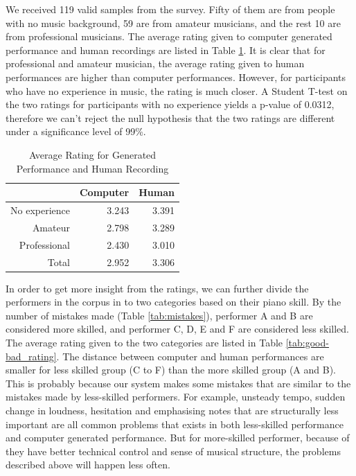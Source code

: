 

We received 119 valid samples from the survey. Fifty of them are from people with no music background, 59 are from amateur musicians, and the rest 10 are from professional musicians. The average rating given to computer generated performance and human recordings are listed in Table \ref{tab:avg_rating}. It is clear that for professional and amateur musician, the average rating given to human performances are higher than computer performances. However, for participants who have no experience in music, the rating is much closer. A Student T-test on the two ratings for participants with no experience yields a p-value of 0.0312, therefore we can't reject the null hypothesis that the two ratings are different under a significance level of 99\%.

\begin{table}
   \centering
   \caption{Average Rating for Generated Performance and Human Recording}
   \label{tab:avg_rating}
   \begin{tabular}{r|rr}
      \hline
      &Computer &Human \\
      \hline
      No experience&3.243&3.391\\
      Amateur&2.798&3.289\\
      Professional&2.430&3.010\\
      \hline
      Total&2.952&3.306\\
      \hline
   \end{tabular}
\end{table}

In order to get more insight from the ratings, we can further divide the performers in the corpus in to two categories based on their piano skill. By the number of mistakes made (Table \ref{tab:mistakes}), performer A and B are considered more skilled, and performer C, D, E and F are considered less skilled. The average rating given to the two categories are listed in Table \ref{tab:good-bad_rating}. The distance between computer and human performances are smaller for less skilled group (C to F) than the more skilled group (A and B). This is probably because our system makes some mistakes that are similar to the mistakes made by less-skilled performers. For example, unsteady tempo, sudden change in loudness, hesitation and emphasising notes that are structurally less important are all common problems that exists in both less-skilled performance and computer generated performance. But for more-skilled performer, because of they have better technical control and sense of musical structure, the problems described above will happen less often. %

